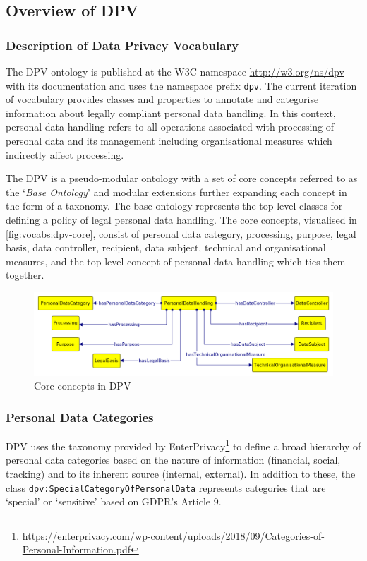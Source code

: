 \subsection{Overview of DPV}
\subsubsection{Description of Data Privacy Vocabulary}
The DPV ontology is published at the W3C namespace \url{http://w3.org/ns/dpv} with its documentation and uses the namespace prefix \texttt{dpv}. 
The current iteration of vocabulary provides classes and properties to annotate and categorise information about legally compliant personal data handling. In this context, personal data handling refers to all operations associated with processing of personal data and its management including organisational measures which indirectly affect processing.

The DPV is a pseudo-modular ontology with a set of core concepts referred to as the `\textit{Base Ontology}' and modular extensions further expanding each concept in the form of a taxonomy. The base ontology represents the top-level classes for defining a policy of legal personal data handling.
The core concepts, visualised in \autoref{fig:vocabs:dpv-core}, consist of personal data category, processing, purpose, legal basis, data controller, recipient, data subject, technical and organisational measures, and the top-level concept of personal data handling which ties them together.

\begin{figure}[htbp]
    \centering
    \includegraphics[width=\linewidth]{img/dpv-personaldatahandling.png}
    \caption{Core concepts in DPV \cite{pandit_creating_2019}}
    \label{fig:vocabs:dpv-core}
\end{figure}

\subsubsection{Personal Data Categories}
DPV uses the taxonomy provided by EnterPrivacy\footnote{\url{https://enterprivacy.com/wp-content/uploads/2018/09/Categories-of-Personal-Information.pdf}} to define a broad hierarchy of personal data categories based on the nature of information (financial, social, tracking) and to its inherent source (internal, external). 
In addition to these, the class \texttt{dpv:Special\-Category\-Of\-PersonalData} represents categories that are `special' or `sensitive' based on GDPR’s Article 9.

